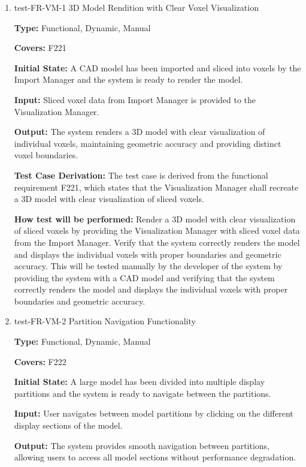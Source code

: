 \documentclass[12pt, titlepage]{article}
\begin{document}
\begin{enumerate}

\item{test-FR-VM-1 3D Model Rendition with Clear Voxel Visualization\\}

\textbf{Type:} Functional, Dynamic, Manual

\textbf{Covers:} F221
					
\textbf{Initial State:} A CAD model has been imported and sliced into voxels by the Import Manager and the system is ready to render the model.
					
\textbf{Input:} Sliced voxel data from Import Manager is provided to the Visualization Manager.
					
\textbf{Output:} The system renders a 3D model with clear visualization of individual voxels, maintaining geometric accuracy and providing distinct voxel boundaries.

\textbf{Test Case Derivation:} The test case is derived from the functional requirement F221, which states that the Visualization Manager shall recreate a 3D model with clear visualization of sliced voxels.
					
\textbf{How test will be performed:} Render a 3D model with clear visualization of sliced voxels by providing the Visualization Manager with sliced voxel data from the Import Manager. Verify that the system correctly renders the model and displays the individual voxels with proper boundaries and geometric accuracy. This will be tested manually by the developer of the system by providing the system with a CAD model and verifying that the system correctly renders the model and displays the individual voxels with proper boundaries and geometric accuracy. 

\item{test-FR-VM-2 Partition Navigation Functionality\\}

\textbf{Type:} Functional, Dynamic, Manual

\textbf{Covers:} F222
					
\textbf{Initial State:} A large model has been divided into multiple display partitions and the system is ready to navigate between the partitions.
					
\textbf{Input:} User navigates between model partitions by clicking on the different display sections of the model.
					
\textbf{Output:} The system provides smooth navigation between partitions, allowing users to access all model sections without performance degradation.


\end{enumerate}
\end{document}
